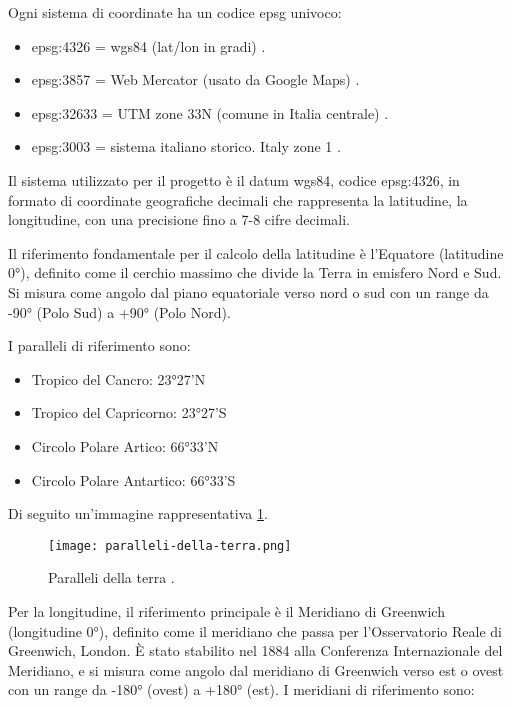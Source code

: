Ogni sistema di coordinate ha un codice \acrshort{epsg} univoco:

\begin{itemize}
  \item \acrshort{epsg}:4326 = \acrshort{wgs84} (lat/lon in gradi) \cite{epsg4326}.
  \item \acrshort{epsg}:3857 = Web Mercator (usato da Google Maps) \cite{epsg3857}.
  \item \acrshort{epsg}:32633 = UTM zone 33N (comune in Italia centrale) \cite{epsg32633}.
  \item \acrshort{epsg}:3003 = sistema italiano storico. Italy zone 1 \cite{epsg3003}.
\end{itemize}

Il sistema utilizzato per il progetto è il datum \acrshort{wgs84}, codice \acrshort{epsg}:4326,
in formato di coordinate geografiche decimali che rappresenta la latitudine, la longitudine,
con una precisione fino a 7-8 cifre decimali.

Il riferimento fondamentale per il calcolo della latitudine è l'Equatore (latitudine 0°),
definito come il cerchio massimo che divide la Terra in emisfero Nord e Sud.
Si misura come angolo dal piano equatoriale verso nord o sud con un range da -90° (Polo Sud) a +90° (Polo Nord).

I paralleli di riferimento sono:

\begin{itemize}
  \item Tropico del Cancro: 23°27'N
  \item Tropico del Capricorno: 23°27'S
  \item Circolo Polare Artico: 66°33'N
  \item Circolo Polare Antartico: 66°33'S
\end{itemize}

Di seguito un'immagine rappresentativa \ref{fig:paralleli-della-terra}.

\begin{figure}[H]
  \centering
  \texttt{[image: paralleli-della-terra.png]}
  \caption{Paralleli della terra \cite{chimica-online-equatore}.}
  \label{fig:paralleli-della-terra}
\end{figure}

Per la longitudine, il riferimento principale è il Meridiano di Greenwich (longitudine 0°),
definito come il meridiano che passa per l'Osservatorio Reale di Greenwich, London.
È stato stabilito nel 1884 alla Conferenza Internazionale del Meridiano, e si misura come angolo dal meridiano
di Greenwich verso est o ovest con un range da -180° (ovest) a +180° (est). I meridiani di riferimento sono:

